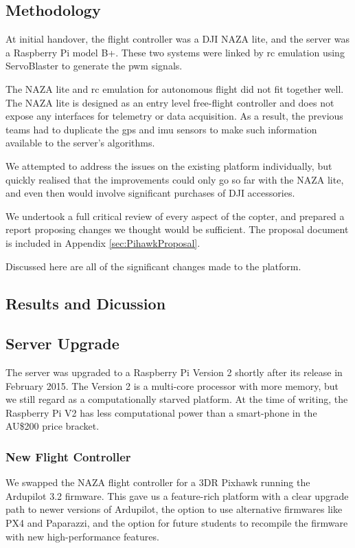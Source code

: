 \documentclass[a4paper, 11pt, titlepage]{article}
\begin{document}
    \subsection{Methodology}
      At initial handover, the flight controller was a DJI NAZA lite, and the server was a Raspberry Pi model B+.  These two systems were linked by \gls{rc} emulation using ServoBlaster \cite{ServoBlaster} to generate the \gls{pwm} signals.

      The NAZA lite and \gls{rc} emulation for autonomous flight did not fit together well. The NAZA lite is designed as an entry level free-flight controller and does not expose any interfaces for telemetry or data acquisition.  As a result, the previous teams had to duplicate the \gls{gps} and \gls{imu} sensors to make such information available to the server's algorithms.

      We attempted to address the issues on the existing platform individually, but quickly realised that the improvements could only go so far with the NAZA lite, and even then would involve significant purchases of DJI accessories.

      We undertook a full critical review of every aspect of the copter, and prepared a report proposing changes we thought would be sufficient.  The proposal document is included in Appendix \ref{sec:PihawkProposal}.

      Discussed here are all of the significant changes made to the platform.


  \subsection{Results and Dicussion}
    \subsection{Server Upgrade}
      The server was upgraded to a Raspberry Pi Version 2 shortly after its release in February 2015.  The Version 2 is a multi-core processor with more memory, but we still regard as a computationally starved platform.
      At the time of writing, the Raspberry Pi V2 has less computational power than a smart-phone in the AU\$200 price bracket.

    \subsubsection{New Flight Controller}
      We swapped the NAZA flight controller for a 3DR Pixhawk \cite{3dr-pixhawk} running the Ardupilot 3.2 firmware.  This gave us a feature-rich platform with a clear upgrade path to newer versions of Ardupilot, the option to use alternative firmwares like PX4 and Paparazzi, and the option for future students to recompile the firmware with new high-performance features.
\end{document}
